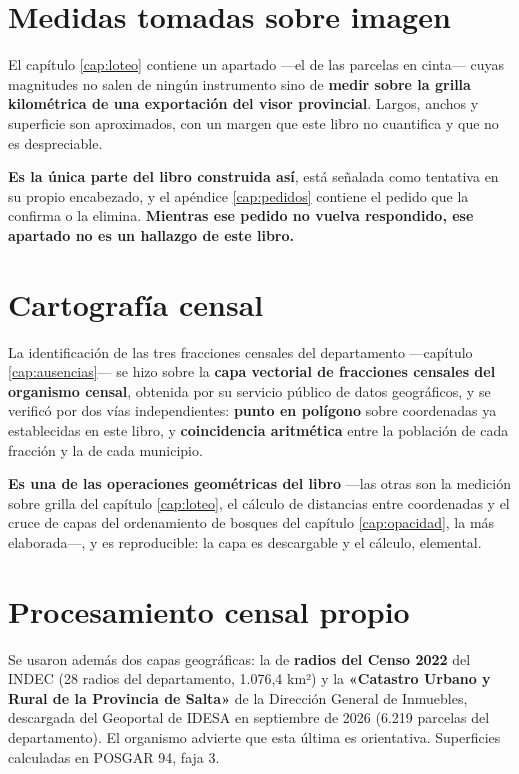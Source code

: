 \section{Medidas tomadas sobre imagen}

El capítulo \ref{cap:loteo} contiene un apartado ---el de las parcelas en cinta--- cuyas magnitudes no salen de ningún instrumento sino de \textbf{medir sobre la grilla kilométrica de una exportación del visor provincial}. Largos, anchos y superficie son aproximados, con un margen que este libro no cuantifica y que no es despreciable.

\textbf{Es la única parte del libro construida así}, está señalada como tentativa en su propio encabezado, y el apéndice \ref{cap:pedidos} contiene el pedido que la confirma o la elimina. \textbf{Mientras ese pedido no vuelva respondido, ese apartado no es un hallazgo de este libro.}

\section{Cartografía censal}

La identificación de las tres fracciones censales del departamento ---capítulo \ref{cap:ausencias}--- se hizo sobre la \textbf{capa vectorial de fracciones censales del organismo censal}, obtenida por su servicio público de datos geográficos, y se verificó por dos vías independientes: \textbf{punto en polígono} sobre coordenadas ya establecidas en este libro, y \textbf{coincidencia aritmética} entre la población de cada fracción y la de cada municipio.

\textbf{Es una de las operaciones geométricas del libro} ---las otras son la medición sobre grilla del capítulo \ref{cap:loteo}, el cálculo de distancias entre coordenadas y el cruce de capas del ordenamiento de bosques del capítulo \ref{cap:opacidad}, la más elaborada---, y es reproducible: la capa es descargable y el cálculo, elemental.

\section{Procesamiento censal propio}

Se usaron además dos capas geográficas: la de \textbf{radios del Censo 2022} del INDEC (28 radios del departamento, 1.076,4 km²) y la \textbf{«Catastro Urbano y Rural de la Provincia de Salta»} de la Dirección General de Inmuebles, descargada del Geoportal de IDESA en septiembre de 2026 (6.219 parcelas del departamento). El organismo advierte que esta última es orientativa. Superficies calculadas en POSGAR 94, faja 3.


